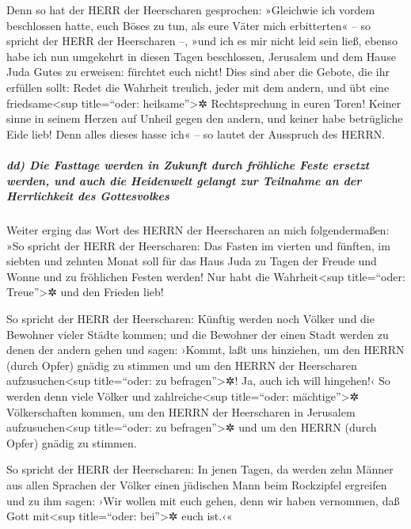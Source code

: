  Denn so hat der HERR der Heerscharen gesprochen:
»Gleichwie ich vordem beschlossen hatte, euch Böses zu tun, als eure
Väter mich erbitterten« -- so spricht der HERR der Heerscharen --, »und
ich es mir nicht leid sein ließ,  ebenso habe ich nun
umgekehrt in diesen Tagen beschlossen, Jerusalem und dem Hause Juda
Gutes zu erweisen: fürchtet euch nicht!  Dies sind aber
die Gebote, die ihr erfüllen sollt: Redet die Wahrheit treulich, jeder
mit dem andern, und übt eine friedsame\textless sup title=``oder:
heilsame''\textgreater✲ Rechtsprechung in euren Toren! 
Keiner sinne in seinem Herzen auf Unheil gegen den andern, und keiner
habe betrügliche Eide lieb! Denn alles dieses hasse ich« -- so lautet
der Ausspruch des HERRN.

\hypertarget{dd-die-fasttage-werden-in-zukunft-durch-fruxf6hliche-feste-ersetzt-werden-und-auch-die-heidenwelt-gelangt-zur-teilnahme-an-der-herrlichkeit-des-gottesvolkes}{%
\subparagraph{dd) Die Fasttage werden in Zukunft durch fröhliche Feste
ersetzt werden, und auch die Heidenwelt gelangt zur Teilnahme an der
Herrlichkeit des
Gottesvolkes}\label{dd-die-fasttage-werden-in-zukunft-durch-fruxf6hliche-feste-ersetzt-werden-und-auch-die-heidenwelt-gelangt-zur-teilnahme-an-der-herrlichkeit-des-gottesvolkes}}

 Weiter erging das Wort des HERRN der Heerscharen an mich
folgendermaßen:  »So spricht der HERR der Heerscharen:
Das Fasten im vierten und fünften, im siebten und zehnten Monat soll für
das Haus Juda zu Tagen der Freude und Wonne und zu fröhlichen Festen
werden! Nur habt die Wahrheit\textless sup title=``oder:
Treue''\textgreater✲ und den Frieden lieb!

 So spricht der HERR der Heerscharen: Künftig werden noch
Völker und die Bewohner vieler Städte kommen;  und die
Bewohner der einen Stadt werden zu denen der andern gehen und sagen:
›Kommt, laßt uns hinziehen, um den HERRN (durch Opfer) gnädig zu stimmen
und um den HERRN der Heerscharen aufzusuchen\textless sup title=``oder:
zu befragen''\textgreater✲! Ja, auch ich will hingehen!‹ 
So werden denn viele Völker und zahlreiche\textless sup title=``oder:
mächtige''\textgreater✲ Völkerschaften kommen, um den HERRN der
Heerscharen in Jerusalem aufzusuchen\textless sup title=``oder: zu
befragen''\textgreater✲ und um den HERRN (durch Opfer) gnädig zu
stimmen.

 So spricht der HERR der Heerscharen: In jenen Tagen, da
werden zehn Männer aus allen Sprachen der Völker einen jüdischen Mann
beim Rockzipfel ergreifen und zu ihm sagen: ›Wir wollen mit euch gehen,
denn wir haben vernommen, daß Gott mit\textless sup title=``oder:
bei''\textgreater✲ euch ist.‹«

